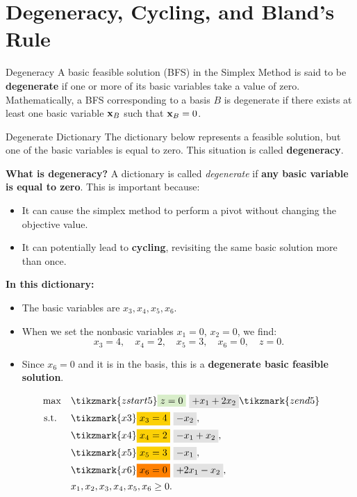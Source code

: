 \section{Degeneracy, Cycling, and Bland's Rule}
\label{sec:degeneracy}

\begin{definition}{Degeneracy}{}
A basic feasible solution (BFS) in the Simplex Method is said to be \textbf{degenerate} if one or more of its basic variables take a value of zero. Mathematically, a BFS corresponding to a basis \( B \) is degenerate if there exists at least one basic variable \( \mathbf{x}_B \) such that \( \mathbf{x}_B = 0 \).
\end{definition}

\begin{remark}{Degenerate Dictionary}{}
The dictionary below represents a feasible solution, but one of the basic variables is equal to zero. This situation is called \textbf{degeneracy}.

\textbf{What is degeneracy?}  
A dictionary is called \emph{degenerate} if \textbf{any basic variable is equal to zero}. This is important because:
\begin{itemize}
    \item It can cause the simplex method to perform a pivot without changing the objective value.
    \item It can potentially lead to \textbf{cycling}, revisiting the same basic solution more than once.
\end{itemize}

\textbf{In this dictionary:}
\begin{itemize}
    \item The basic variables are \(x_3, x_4, x_5, x_6\).
    \item When we set the nonbasic variables \(x_1 = 0\), \(x_2 = 0\), we find:
    \[
    x_3 = 4,\quad x_4 = 2,\quad x_5 = 3,\quad x_6 = \boxed{0},\quad z = 0.
    \]
    \item Since \(x_6 = 0\) and it is in the basis, this is a \textbf{degenerate basic feasible solution}.
\end{itemize}

\vspace{1cm}

\[
\begin{aligned}
\max \quad 
& \tikzmark{zstart5} \text{\colorbox{green!20!white}{$z = 0$}} ~ \text{\colorbox{gray!20!white}{$+ x_1 + 2x_2$}} \tikzmark{zend5} \\
\st \quad 
& \tikzmark{x3} \text{\colorbox{yellow}{$x_3 = 4$}} ~ \text{\colorbox{gray!20!white}{$- x_2$}}, \\
& \tikzmark{x4} \text{\colorbox{yellow}{$x_4 = 2$}} ~ \text{\colorbox{gray!20!white}{$- x_1 + x_2$}}, \\
& \tikzmark{x5} \text{\colorbox{yellow}{$x_5 = 3$}} ~ \text{\colorbox{gray!20!white}{$- x_1$}}, \\
& \tikzmark{x6} \text{\colorbox{orange}{$x_6 = 0$}} ~ \text{\colorbox{gray!20!white}{$+ 2x_1 - x_2$}}, \\
& x_1, x_2, x_3, x_4, x_5, x_6 \geq 0.
\end{aligned}
\]


\end{remark}
